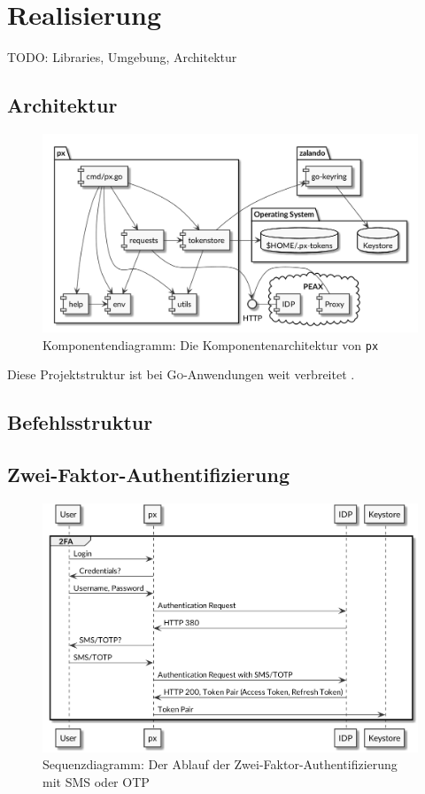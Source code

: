 \section{Realisierung}
\label{sec:Realisierung}

TODO: Libraries, Umgebung, Architektur

\subsection{Architektur}

\begin{figure}
    \centering
    \includegraphics[width=\linewidth]{pics/komponentendiagramm.png}
    \caption{Komponentendiagramm: Die Komponentenarchitektur von \texttt{px}}
\end{figure}

Diese Projektstruktur ist bei \textsc{Go}-Anwendungen weit verbreitet \cite[S. 12]{powerful-cli-apps-in-go}.

\subsection{Befehlsstruktur}

\subsection{Zwei-Faktor-Authentifizierung}

\begin{figure}
    \centering
    \includegraphics[width=\linewidth]{pics/sequence-2fa.png}
    \caption{Sequenzdiagramm: Der Ablauf der Zwei-Faktor-Authentifizierung mit SMS oder OTP}
\end{figure}

